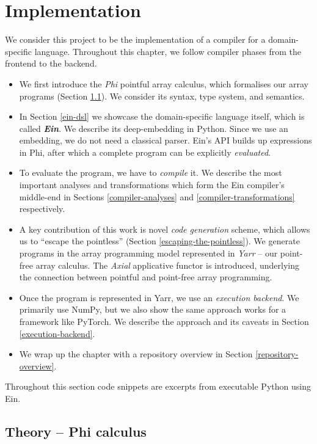 \chapter{Implementation}

We consider this project to be the implementation of a compiler for a domain-specific language. Throughout this chapter, we follow compiler phases from the frontend to the backend. 
\begin{itemize}
    \item We first introduce the \textit{Phi} pointful array calculus, which formalises our array programs (Section \ref{phi-calculus}). We consider its syntax, type system, and semantics.
    \item In Section \ref{ein-dsl} we showcase the domain-specific language itself, which is called \textit{\textbf{Ein}}. We describe its deep-embedding in Python. Since we use an embedding, we do not need a classical parser. Ein's API builds up expressions in Phi, after which a complete program can be explicitly \textit{evaluated}.
    \item To evaluate the program, we have to \textit{compile} it. We describe the most important analyses and transformations which form the Ein compiler's middle-end in Sections \ref{compiler-analyses} and \ref{compiler-transformations} respectively.
    \item A key contribution of this work is novel \textit{code generation} scheme, which allows us to ``escape the pointless'' (Section \ref{escaping-the-pointless}). We generate programs in the array programming model represented in \textit{Yarr} -- our point-free array calculus. The \textit{Axial} applicative functor is introduced, underlying the connection between pointful and point-free array programming.
    \item Once the program is represented in Yarr, we use an \textit{execution backend}. We primarily use NumPy, but we also show the same approach works for a framework like PyTorch. We describe the approach and its caveats in Section \ref{execution-backend}.
    \item We wrap up the chapter with a repository overview in Section \ref{repository-overview}.
\end{itemize}
Throughout this section code snippets are excerpts from executable Python using Ein. 


\section{Theory -- Phi calculus}
\label{phi-calculus}

